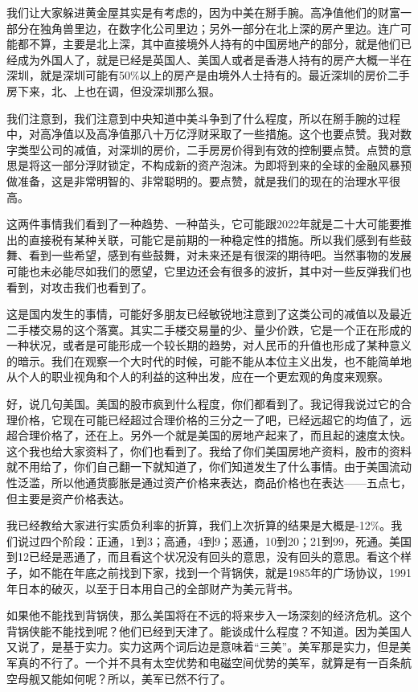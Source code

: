 \documentclass[UTF8, 12pt, a4paper]{ctexrep}
\begin{document}
我们让大家躲进黄金屋其实是有考虑的，因为中美在掰手腕。高净值他们的财富一部分在独角兽里边，在数字化公司里边；另外一部分在北上深的房产里边。连广可能都不算，主要是北上深，其中直接境外人持有的中国房地产的部分，就是他们已经成为外国人了，就是已经是英国人、美国人或者是香港人持有的房产大概一半在深圳，就是深圳可能有50\%以上的房产是由境外人士持有的。最近深圳的房价二手房下来，北、上也在调，但没深圳那么狠。

我们注意到，我们注意到中央知道中美斗争到了什么程度，所以在掰手腕的过程中，对高净值以及高净值那八十万亿浮财采取了一些措施。这个也要点赞。我对数字类型公司的减值，对深圳的房价，二手房房价得到有效的控制要点赞。点赞的意思是将这一部分浮财锁定，不构成新的资产泡沫。为即将到来的全球的金融风暴预做准备，这是非常明智的、非常聪明的。要点赞，就是我们的现在的治理水平很高。

这两件事情我们看到了一种趋势、一种苗头，它可能跟2022年就是二十大可能要推出的直接税有某种关联，可能它是前期的一种稳定性的措施。所以我们感到有些鼓舞、看到一些希望，感到有些鼓舞，对未来还是有很深的期待吧。当然事物的发展可能也未必能尽如我们的愿望，它里边还会有很多的波折，其中对一些反弹我们也看到，对攻击我们也看到了。

这是国内发生的事情，可能好多朋友已经敏锐地注意到了这类公司的减值以及最近二手楼交易的这个落寞。其实二手楼交易量的少、量少价跌，它是一个正在形成的一种状况，或者是可能形成一个较长期的趋势，对人民币的升值也形成了某种意义的暗示。我们在观察一个大时代的时候，可能不能从本位主义出发，也不能简单地从个人的职业视角和个人的利益的这种出发，应在一个更宏观的角度来观察。

好，说几句美国。美国的股市疯到什么程度，你们都看到了。我记得我说过它的合理价格，它现在可能已经超过合理价格的三分之一了吧，已经远超它的均值了，远超合理价格了，还在上。另外一个就是美国的房地产起来了，而且起的速度太快。这个我也给大家资料了，你们也看到了。我给了你们美国房地产资料，股市的资料就不用给了，你们自己翻一下就知道了，你们知道发生了什么事情。由于美国流动性泛滥，所以他通货膨胀是通过资产价格来表达，商品价格也在表达——五点七，但主要是资产价格表达。

我已经教给大家进行实质负利率的折算，我们上次折算的结果是大概是-12\%。我们说过四个阶段：正通，1到3；高通，4到9；恶通，10到20；21到99，死通。美国到12已经是恶通了，而且看这个状况没有回头的意思，没有回头的意思。看这个样子，如不能在年底之前找到下家，找到一个背锅侠，就是1985年的广场协议，1991年日本的破灭，以至于日本用自己的全部财产为美元背书。

如果他不能找到背锅侠，那么美国将在不远的将来步入一场深刻的经济危机。这个背锅侠能不能找到呢？他们已经到天津了。能谈成什么程度？不知道。因为美国人又说了，是基于实力。实力这两个词后边是意味着“三美”。美军那是实力，但是美军真的不行了。一个并不具有太空优势和电磁空间优势的美军，就算是有一百条航空母舰又能如何呢？所以，美军已然不行了。
\end{document}
